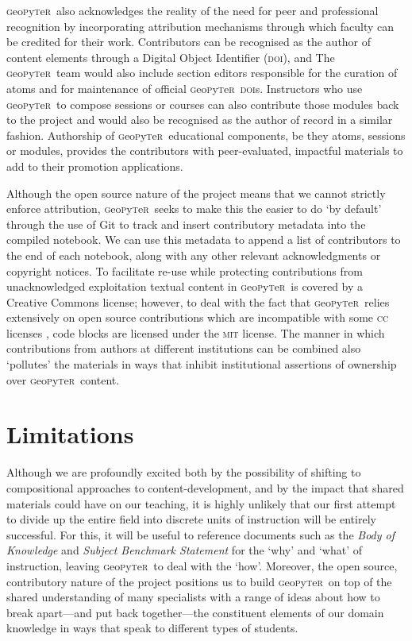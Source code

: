 \documentclass[letter, 11pt]{article}
\newcommand{\gp}{\textsc{g}eo\textsc{p}y\textsc{t}e\textsc{r}~\/}
\begin{document}
\gp also acknowledges the reality of the need for peer and professional recognition by incorporating attribution mechanisms through which faculty can be credited for their work. Contributors can be recognised as the author of content elements through a Digital Object Identifier (\textsc{doi}), and The \gp team would also include section editors responsible for the curation of atoms and for maintenance of official \gp \textsc{doi}s. Instructors who use \gp to compose sessions or courses can also contribute those modules back to the project and would also be recognised as the author of record in a similar fashion. Authorship of \gp educational components, be they atoms, sessions or modules, provides the contributors with peer-evaluated, impactful materials to add to their promotion applications.

Although the open source nature of the project means that we cannot strictly enforce attribution, \gp seeks to make this the easier to do `by default' through the use of Git to track and insert contributory metadata into the compiled notebook. We can use this metadata to append a list of contributors to the end of each notebook, along with any other relevant acknowledgments or copyright notices. To facilitate re-use while protecting contributions from unacknowledged exploitation textual content in \gp is covered by a Creative Commons license; however, to deal with the fact that \gp relies extensively on open source contributions which are incompatible with some \textsc{cc} licenses \citep[see discussion in][]{osswatch2013}, code blocks are licensed under the \textsc{mit} license. The manner in which contributions from authors at different institutions can be combined also `pollutes' the materials in ways that inhibit institutional assertions of ownership over \gp content.

\section{Limitations}\label{limitations}

Although we are profoundly excited both by the possibility of shifting to compositional approaches to content-development, and by the impact that shared materials could have on our teaching, it is highly unlikely that our first attempt to divide up the entire field into discrete units of instruction will be entirely successful. For this, it will be useful to reference documents such as the \textit{Body of Knowledge} \citep{bok2018} and \textit{Subject Benchmark Statement} \citep{QAA2014} for the `why' and `what' of instruction, leaving \gp to deal with the `how'. Moreover, the open source, contributory nature of the project positions us to build \gp on top of the shared understanding of many specialists with a range of ideas about how to break apart---and put back together---the constituent elements of our domain knowledge in ways that speak to different types of students.
\end{document}
